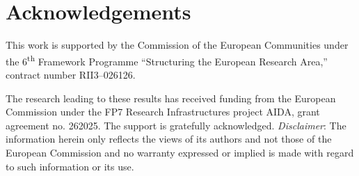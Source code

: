 \begin{spacing}{0.92}
\tableofcontents
\end{spacing}












\appendix





\printglossaries

\section*{Acknowledgements}
This work is supported by the Commission of the European Communities
under the 6\textsuperscript{th} Framework Programme
``Structuring the European Research Area,'' contract number
RII3--026126.

The research leading to these results has received funding from the
European Commission under the FP7 Research Infrastructures project
AIDA, grant agreement no. 262025. The support is gratefully
acknowledged. 
\emph{Disclaimer}: The information herein only reflects the views of its authors and not those of the European Commission and no warranty expressed or implied is made with regard to such information or its use.


%




